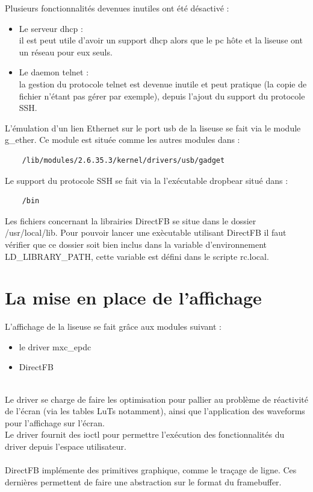 Plusieurs fonctionnalités devenues inutiles ont été désactivé :
\begin{itemize}
	\item Le serveur dhcp : \\
		il est peut utile d'avoir un support dhcp alors que le pc hôte et la liseuse 
		ont un réseau pour eux seuls.
	\item Le daemon telnet : \\
		la gestion du protocole telnet est devenue inutile et peut pratique (la copie de fichier
		 n'étant pas gérer par exemple), depuis l'ajout du support du protocole SSH.
\end{itemize}

L'émulation d'un lien Ethernet sur le port usb de la liseuse se fait via le module g_ether.
Ce module est située comme les autres modules dans :
	\begin{lstlisting}
	/lib/modules/2.6.35.3/kernel/drivers/usb/gadget
	\end{lstlisting}

Le support du protocole SSH se fait via la l'exécutable dropbear situé dans : 
	\begin{lstlisting}
	/bin
	\end{lstlisting}

Les fichiers concernant la librairies DirectFB se situe dans le dossier /usr/local/lib.
Pour pouvoir lancer une exècutable utilisant DirectFB il faut vérifier que ce dossier soit bien inclus dans la variable d'environnement LD_LIBRARY_PATH, cette variable est défini dans le scripte rc.local.
\section{La mise en place de l'affichage}

L'affichage de la liseuse se fait grâce aux modules suivant : 
\begin{itemize}
	\item le driver mxc_epdc
	\item DirectFB
\end{itemize}~\\

Le driver se charge de faire les optimisation pour pallier au problème de réactivité de l'écran (via les tables LuTs notamment), ainsi que l'application des waveforms pour l'affichage sur l'écran.\\
Le driver fournit des ioctl pour permettre l'exécution des fonctionnalités du driver depuis l'espace utilisateur.~\\~\\
DirectFB implémente des primitives graphique, comme le traçage de ligne. Ces dernières permettent de faire une abstraction sur le format du framebuffer.

